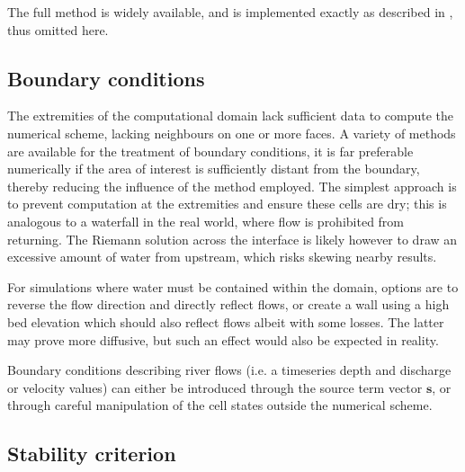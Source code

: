 The full method is widely available, and is implemented exactly as described in \citet{Toro1994}, thus omitted here.

\subsection{Boundary conditions}

The extremities of the computational domain lack sufficient data to compute the numerical scheme, lacking neighbours on one or more faces. A variety of methods are available for the treatment of boundary conditions, it is far preferable numerically if the area of interest is sufficiently distant from the boundary, thereby reducing the influence of the method employed. The simplest approach is to prevent computation at the extremities and ensure these cells are dry; this is analogous to a waterfall in the real world, where flow is prohibited from returning. The Riemann solution across the interface is likely however to draw an excessive amount of water from upstream, which risks skewing nearby results.

For simulations where water must be contained within the domain, options are to reverse the flow direction and directly reflect flows, or create a wall using a high bed elevation which should also reflect flows albeit with some losses. The latter may prove more diffusive, but such an effect would also be expected in reality.

Boundary conditions describing river flows (i.e. a timeseries depth and discharge or velocity values) can either be introduced through the source term vector $\mathbf{s}$, or through careful manipulation of the cell states outside the numerical scheme. 

\subsection{Stability criterion}

